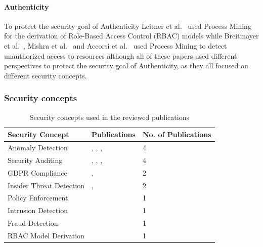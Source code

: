 \documentclass[runningheads]{llncs}
\begin{document}
\paragraph{Authenticity} To protect the security goal of Authenticity Leitner et al.~\cite{Leitner2013719} used Process Mining for the derivation of Role-Based Access Control (RBAC) models while Breitmayer et al.~\cite{Breitmayer202411}, Mishra et al.~\cite{Mishra2018613}
and Accorsi et al.~\cite{Accorsi20131462} used Process Mining to detect unauthorized access to resources although all of these papers used different perspectives to protect the security goal of Authenticity, as they all focused on different security concepts.
\subsubsection{Security concepts}\label{concepts}
\begin{table}
    \centering
    \caption{Security concepts used in the reviewed publications}
    \label{concepts_table}
    \begin{tabular}{ | l | l | l | }
        \hline
        \textbf{Security Concept} & \textbf{Publications}                                                                           & \textbf{No. of Publications} \\
        \hline
        \hline
        Anomaly Detection         & \cite{Fazzinga2020}, \cite{MozafariMehr2022397}, \cite{Breitmayer202411}, \cite{Sarno2020}      & 4                            \\
        \hline
        Security Auditing         & \cite{Accorsi20131462}, \cite{Zahoransky2014360}, \cite{Yunizal20221387}, \cite{Dedousis202235} & 4                            \\
        \hline
        GDPR Compliance           & \cite{Zaman20192982}, \cite{MozafariMehr202182}                                                 & 2                            \\
        \hline
        Insider Threat Detection  & \cite{Zhu201783}, \cite{MacAk2020}                                                              & 2                            \\
        \hline
        Policy Enforcement        & \cite{Talamo2013}                                                                               & 1                            \\
        \hline
        Intrusion Detection       & \cite{Mishra2018613}                                                                            & 1                            \\
        \hline
        Fraud Detection           & \cite{Mardani2013}                                                                              & 1                            \\
        \hline
        RBAC Model Derivation     & \cite{Leitner2013719}                                                                           & 1                            \\
        \hline
    \end{tabular}
\end{table}
\end{document}
